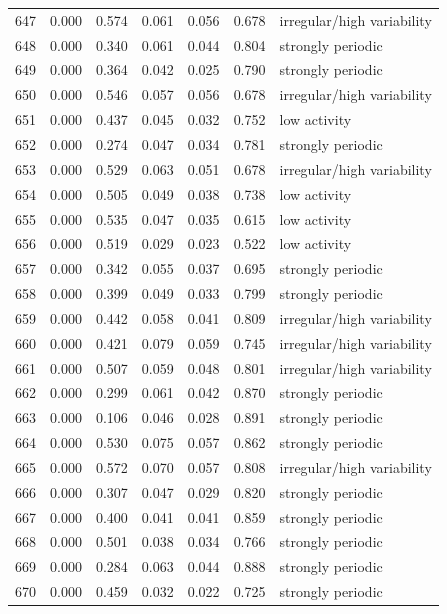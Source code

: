 \begin{longtable}{lrrrrrl}
647 & 0.000 & 0.574 & 0.061 & 0.056 & 0.678 & irregular/high variability \\
648 & 0.000 & 0.340 & 0.061 & 0.044 & 0.804 & strongly periodic \\
649 & 0.000 & 0.364 & 0.042 & 0.025 & 0.790 & strongly periodic \\
650 & 0.000 & 0.546 & 0.057 & 0.056 & 0.678 & irregular/high variability \\
651 & 0.000 & 0.437 & 0.045 & 0.032 & 0.752 & low activity \\
652 & 0.000 & 0.274 & 0.047 & 0.034 & 0.781 & strongly periodic \\
653 & 0.000 & 0.529 & 0.063 & 0.051 & 0.678 & irregular/high variability \\
654 & 0.000 & 0.505 & 0.049 & 0.038 & 0.738 & low activity \\
655 & 0.000 & 0.535 & 0.047 & 0.035 & 0.615 & low activity \\
656 & 0.000 & 0.519 & 0.029 & 0.023 & 0.522 & low activity \\
657 & 0.000 & 0.342 & 0.055 & 0.037 & 0.695 & strongly periodic \\
658 & 0.000 & 0.399 & 0.049 & 0.033 & 0.799 & strongly periodic \\
659 & 0.000 & 0.442 & 0.058 & 0.041 & 0.809 & irregular/high variability \\
660 & 0.000 & 0.421 & 0.079 & 0.059 & 0.745 & irregular/high variability \\
661 & 0.000 & 0.507 & 0.059 & 0.048 & 0.801 & irregular/high variability \\
662 & 0.000 & 0.299 & 0.061 & 0.042 & 0.870 & strongly periodic \\
663 & 0.000 & 0.106 & 0.046 & 0.028 & 0.891 & strongly periodic \\
664 & 0.000 & 0.530 & 0.075 & 0.057 & 0.862 & strongly periodic \\
665 & 0.000 & 0.572 & 0.070 & 0.057 & 0.808 & irregular/high variability \\
666 & 0.000 & 0.307 & 0.047 & 0.029 & 0.820 & strongly periodic \\
667 & 0.000 & 0.400 & 0.041 & 0.041 & 0.859 & strongly periodic \\
668 & 0.000 & 0.501 & 0.038 & 0.034 & 0.766 & strongly periodic \\
669 & 0.000 & 0.284 & 0.063 & 0.044 & 0.888 & strongly periodic \\
670 & 0.000 & 0.459 & 0.032 & 0.022 & 0.725 & strongly periodic \\

\end{longtable}

